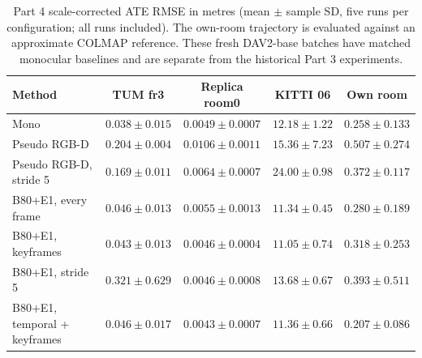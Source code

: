 \begin{table}[t]
\centering
\caption{Part 4 scale-corrected ATE RMSE in metres (mean $\pm$ sample SD, five runs per configuration; all runs included). The own-room trajectory is evaluated against an approximate COLMAP reference. These fresh DAV2-base batches have matched monocular baselines and are separate from the historical Part 3 experiments.}
\label{tab:p4}
\scriptsize
\setlength{\tabcolsep}{5pt}
\begin{tabular}{lcccc}
\toprule
Method & TUM fr3 & Replica room0 & KITTI 06 & Own room \\
\midrule
Mono & $0.038 \pm 0.015$ & $0.0049 \pm 0.0007$ & $12.18 \pm 1.22$ & $0.258 \pm 0.133$ \\
\midrule
Pseudo RGB-D & $0.204 \pm 0.004$ & $0.0106 \pm 0.0011$ & $15.36 \pm 7.23$ & $0.507 \pm 0.274$ \\
Pseudo RGB-D, stride 5 & $0.169 \pm 0.011$ & $0.0064 \pm 0.0007$ & $24.00 \pm 0.98$ & $0.372 \pm 0.117$ \\
\midrule
B80+E1, every frame & $0.046 \pm 0.013$ & $0.0055 \pm 0.0013$ & $11.34 \pm 0.45$ & $0.280 \pm 0.189$ \\
B80+E1, keyframes & $0.043 \pm 0.013$ & $0.0046 \pm 0.0004$ & $11.05 \pm 0.74$ & $0.318 \pm 0.253$ \\
B80+E1, stride 5 & $0.321 \pm 0.629$ & $0.0046 \pm 0.0008$ & $13.68 \pm 0.67$ & $0.393 \pm 0.511$ \\
B80+E1, temporal + keyframes & $0.046 \pm 0.017$ & $0.0043 \pm 0.0007$ & $11.36 \pm 0.66$ & $0.207 \pm 0.086$ \\
\bottomrule
\end{tabular}
\end{table}
